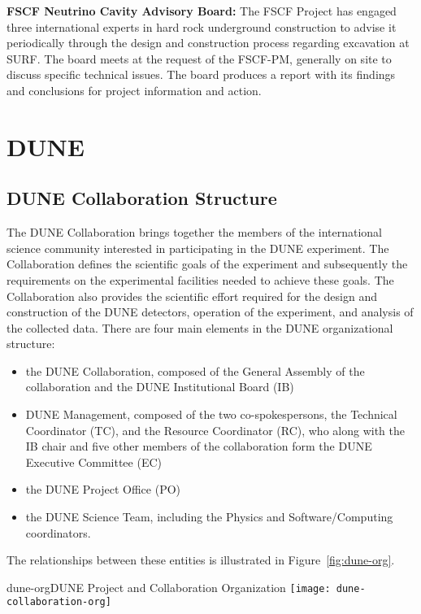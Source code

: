\textbf{FSCF Neutrino Cavity Advisory Board:} The FSCF Project has engaged three international experts in hard rock underground construction to advise it periodically through the design and construction process regarding excavation at SURF. The board meets at the request of the FSCF-PM, generally on site to discuss specific technical issues. The board produces a report with its findings and conclusions for project information and action. 



\section{DUNE}

\subsection{DUNE Collaboration Structure}

The DUNE Collaboration brings together the members of the international science community 
interested in participating in the DUNE experiment.  The Collaboration defines the scientific goals of the experiment and subsequently 
the requirements on the experimental facilities needed to achieve these goals.  The Collaboration also provides the scientific effort required for the design and construction of the DUNE detectors, operation of the experiment, and analysis of the 
collected data. There are four main elements in the DUNE organizational structure:  
\begin{itemize}
\item the DUNE Collaboration, composed of the General Assembly of the collaboration and the DUNE Institutional Board (IB)     
\item DUNE Management, composed of the two co-spokespersons, the Technical Coordinator (TC), and the Resource Coordinator (RC), who along
  with the IB chair and five other members of the collaboration form the DUNE Executive Committee (EC)
\item the DUNE Project Office (PO)
\item the DUNE Science Team, including the Physics and Software/Computing coordinators. 
\end{itemize}
The relationships between these entities is illustrated in Figure~\ref{fig:dune-org}.

\begin{cdrfigure}{dune-org}{DUNE Project and Collaboration Organization}
  \texttt{[image: dune-collaboration-org]}
\end{cdrfigure}

